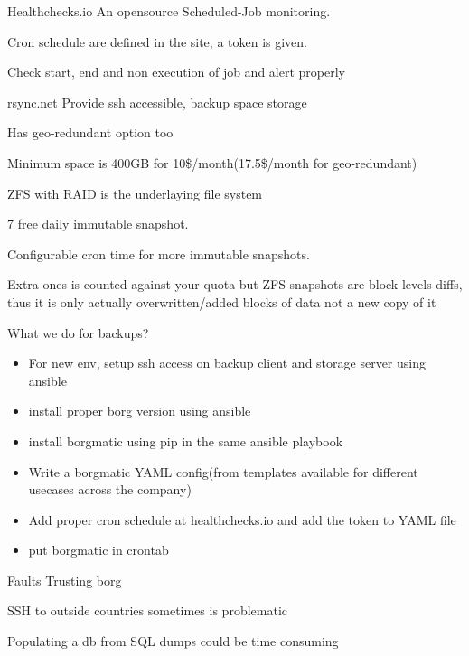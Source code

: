 \documentclass{beamer}
\begin{document}
\begin{frame}{Healthchecks.io}
	An opensource Scheduled-Job monitoring.
	
	Cron schedule are defined in the site, a token is given.

	Check start, end and non execution of job and alert properly
	
\end{frame}


\begin{frame}{rsync.net}
	Provide ssh accessible, backup space storage
	
	Has geo-redundant option too
	
	Minimum space is 400GB for 10\$/month(17.5\$/month for geo-redundant)
	
	ZFS with RAID is the underlaying file system
	
	7 free daily immutable snapshot.
	
	Configurable cron time for more immutable snapshots.
	
	 Extra ones is counted against your quota but ZFS snapshots are block levels diffs, thus it is only actually overwritten/added blocks of data not a new copy of it
\end{frame}


\begin{frame}{What we do for backups?}
	\begin{itemize}
		\item For new env, setup ssh access on backup client and storage server using ansible
		\item install proper borg version using ansible 
		\item install borgmatic using pip in the same ansible playbook
		\item Write a borgmatic YAML config(from templates available for different usecases across the company)
		\item Add proper cron schedule at healthchecks.io and add the token to YAML file
		\item put borgmatic in crontab
	\end{itemize}
\end{frame}
\begin{frame}{Faults}
	Trusting borg
	
	SSH to outside countries sometimes is problematic
	
	Populating a db from SQL dumps could be time consuming
	
	
\end{frame}
\end{document}
